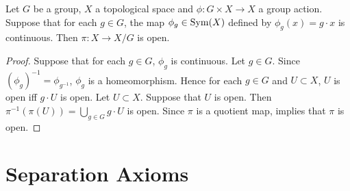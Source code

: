 \documentclass{book}
\begin{document}
	\begin{ex}  
		Let $G$ be a group, $X$ a topological space and $\phi: G \times X \rightarrow X$ a group action. Suppose that for each $g \in G$, the map $\phi_g \in \operatorname{Sym}(X)$ defined by $\phi_g(x) = g \cdot x$ is continuous. Then $\pi: X \rightarrow X / G$ is open. 
	\end{ex}

	\begin{proof}
		Suppose that for each $g \in G$, $\phi_g$ is continuous. Let $g \in G$. Since $(\phi_g)^{-1} = \phi_{g^{-1}}$, $\phi_g$ is a homeomorphism. Hence for each $g \in G$ and $U \subset X$, $U$ is open iff $g \cdot U$ is open. Let $U \subset X$. Suppose that $U$ is open. Then $\pi^{-1}(\pi(U)) = \bigcup_{g \in G} g \cdot U$ is open. Since $\pi$ is a quotient map,  implies that $\pi$ is open.
	\end{proof}

	
	
	
	
	
	
	
	
	
	
	
	
	
	
	
	
	
	
	
	
	
	
	
	
	
	
	
	\newpage
	\section{Separation Axioms}
	
\end{document}
